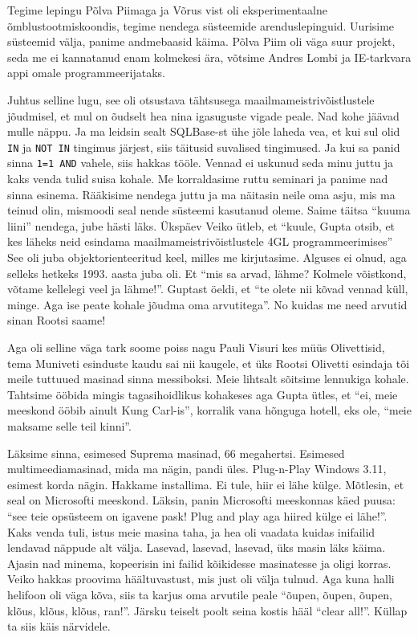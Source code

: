 Tegime lepingu Põlva Piimaga ja Võrus vist oli 
eksperimentaalne õmblustootmiskoondis, tegime nendega süsteemide 
arenduslepinguid. Uurisime süsteemid välja, panime andmebaasid käima.  Põlva 
Piim oli väga suur projekt, seda me ei kannatanud enam kolmekesi ära, võtsime 
Andres Lombi ja IE-tarkvara appi 
omale programmeerijataks. 

Juhtus selline lugu, see oli otsustava tähtsusega maailmameistrivõistlustele 
jõudmisel, et  mul on õudselt hea nina igasuguste vigade peale. Nad kohe jäävad 
mulle näppu. Ja ma leidsin sealt SQLBase-st ühe jõle laheda vea, et kui sul 
olid \verb|IN| ja  \verb|NOT IN| tingimus järjest, siis täitusid suvalised 
tingimused. Ja kui sa panid sinna \verb|1=1 AND| vahele, siis hakkas tööle. 
Vennad ei uskunud seda minu juttu ja kaks venda tulid suisa kohale. Me 
korraldasime  ruttu seminari ja panime nad sinna esinema. Rääkisime nendega 
juttu ja ma näitasin neile oma asju, mis ma teinud olin, mismoodi seal nende 
süsteemi kasutanud oleme. Saime täitsa \enquote{kuuma liini} nendega, jube 
hästi läks. Ükspäev Veiko ütleb, et \enquote{kuule, 
Gupta otsib, et kes läheks neid esindama 
maailmameistrivõistlustele 4GL programmeerimises} See oli juba 
objektorienteeritud keel, milles me kirjutasime. Alguses ei olnud, aga selleks 
hetkeks 1993. aasta juba oli. Et \enquote{mis sa arvad, lähme? Kolmele 
võistkond, võtame kellelegi veel ja lähme!}. Guptast öeldi, et \enquote{te 
olete nii kõvad vennad küll, minge. Aga ise peate kohale jõudma oma 
arvutitega}. No kuidas me need arvutid sinan Rootsi saame! 

Aga oli selline väga tark soome poiss nagu Pauli Visuri kes müüs Olivettisid, tema Muniveti esinduste kaudu sai nii kaugele, et 
üks Rootsi Olivetti esindaja tõi meile tuttuued masinad sinna messiboksi. Meie 
lihtsalt sõitsime lennukiga kohale. Tahtsime ööbida mingis tagasihoidlikus 
kohakeses aga Gupta ütles, et \enquote{ei, meie meeskond ööbib ainult Kung 
Carl-is}, korralik vana hõnguga hotell, eks ole, \enquote{meie maksame selle 
teil kinni}. 

Läksime sinna, esimesed Suprema masinad, 66 megahertsi. Esimesed 
multimeediamasinad, mida  ma nägin, pandi üles. Plug-n-Play Windows 3.11, 
esimest korda nägin. Hakkame installima. Ei tule, hiir ei lähe külge. Mõtlesin, 
et seal on Microsofti meeskond. Läksin, panin Microsofti meeskonnas käed puusa: 
\enquote{see teie opsüsteem on igavene pask! Plug and play aga hiired külge ei 
lähe!}. Kaks venda tuli, istus meie masina taha, ja hea oli vaadata kuidas 
inifailid lendavad näppude alt 
välja. Lasevad, lasevad, lasevad, üks masin läks käima. Ajasin nad minema, 
kopeerisin ini failid kõikidesse masinatesse ja oligi  korras.  Veiko hakkas 
proovima häältuvastust, mis just oli välja tulnud. Aga kuna halli helifoon oli 
väga kõva, siis ta karjus oma arvutile peale \enquote{õupen, õupen, õupen, 
klõus, klõus, klõus, ran!}. Järsku teiselt poolt seina kostis hääl 
\enquote{clear all!}. Küllap ta siis käis närvidele. 

